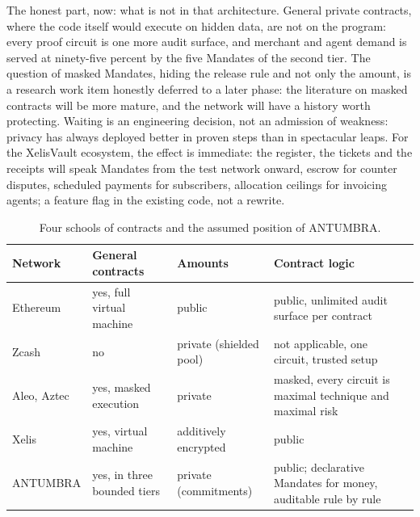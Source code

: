 The honest part, now: what is not in that architecture. General private
contracts, where the code itself would execute on hidden data, are not
on the program: every proof circuit is one more audit surface, and
merchant and agent demand is served at ninety-five percent by the five
Mandates of the second tier. The question of masked Mandates, hiding the
release rule and not only the amount, is a research work item honestly
deferred to a later phase: the literature on masked contracts will be
more mature, and the network will have a history worth protecting.
Waiting is an engineering decision, not an admission of weakness:
privacy has always deployed better in proven steps than in spectacular
leaps. For the XelisVault ecosystem, the effect is immediate: the
register, the tickets and the receipts will speak Mandates from the
test network onward, escrow for counter disputes, scheduled payments for
subscribers, allocation ceilings for invoicing agents; a feature flag in
the existing code, not a rewrite.

\begin{table}[htbp]
\centering
\small
\caption{Four schools of contracts and the assumed position of ANTUMBRA.}
\label{tab:contractcomp}
\begin{tabularx}{\textwidth}{@{}L{2.2cm}YYYY@{}}
\toprule
Network & General contracts & Amounts & Contract logic \\
\midrule
Ethereum & yes, full virtual machine & public & public, unlimited audit surface per contract \\
Zcash & no & private (shielded pool) & not applicable, one circuit, trusted setup \\
Aleo, Aztec & yes, masked execution & private & masked, every circuit is maximal technique and maximal risk \\
Xelis & yes, virtual machine & additively encrypted & public \\
ANTUMBRA & yes, in three bounded tiers & private (commitments) & public; declarative Mandates for money, auditable rule by rule \\
\bottomrule
\end{tabularx}
\end{table}
